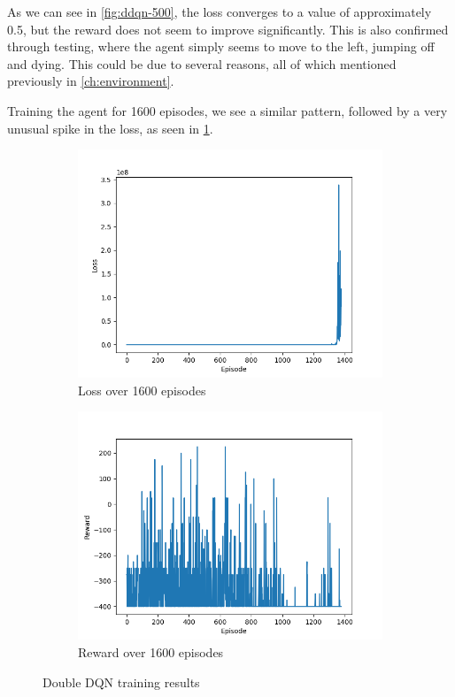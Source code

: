 As we can see in \cref{fig:ddqn-500}, the loss converges to a value of
approximately 0.5, but the reward does not seem to improve significantly.
This is also confirmed through testing, where the agent simply seems to move
to the left, jumping off and dying. This could be due to several reasons,
all of which mentioned previously in \cref{ch:environment}.

Training the agent for 1600 episodes, we see a similar pattern, followed
by a very unusual spike in the loss, as seen in \cref{fig:ddqn-2000-1600-loss}.

\begin{figure}[H]
    \begin{subfigure}{0.45\textwidth}
        \centering
        \includegraphics[width=\textwidth]{img/ddqn-2000-1600-loss.png}
        \caption{Loss over 1600 episodes}
        \label{fig:ddqn-2000-1600-loss}
    \end{subfigure}
    \begin{subfigure}{0.45\textwidth}
        \centering
        \includegraphics[width=\textwidth]{img/ddqn-2000-1600-reward.png}
        \caption{Reward over 1600 episodes}
        \label{fig:ddqn-2000-1600-reward}
    \end{subfigure}
    \caption{Double DQN training results}
    \label{fig:ddqn-2000-1600}
\end{figure}

